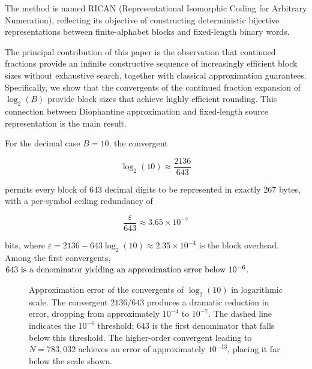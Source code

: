 \documentclass[10pt, onecolumn]{IEEEtran}
\begin{document}
The method is named RICAN (Representational Isomorphic Coding for Arbitrary Numeration), reflecting its objective of constructing deterministic bijective representations between finite-alphabet blocks and fixed-length binary words.

The principal contribution of this paper is the observation that continued fractions provide an infinite constructive sequence of increasingly efficient block sizes without exhaustive search, together with classical approximation guarantees. Specifically, we show that the convergents of the continued fraction expansion of \(\log_2(B)\) provide block sizes that achieve highly efficient rounding. This connection between Diophantine approximation and fixed-length source representation is the main result.

For the decimal case \(B=10\), the convergent

\[
\log_2(10)\approx\frac{2136}{643}
\]

permits every block of \(643\) decimal digits to be represented in exactly \(267\) bytes, with a per-symbol ceiling redundancy of

\[
\frac{\varepsilon}{643} \approx 3.65\times10^{-7}
\]

bits, where \(\varepsilon = 2136 - 643\log_2(10) \approx 2.35\times10^{-4}\) is the block overhead. Among the first convergents, \(643$ is a denominator yielding an approximation error below $10^{-6}\).

\begin{figure}[ht]
\centering
{}
\caption{Approximation error of the convergents of $\log_2(10)$ in logarithmic scale. The convergent $2136/643$ produces a dramatic reduction in error, dropping from approximately $10^{-4}$ to $10^{-7}$. The dashed line indicates the $10^{-6}$ threshold; $643$ is the first denominator that falls below this threshold. The higher-order convergent leading to $N=783,032$ achieves an error of approximately $10^{-13}$, placing it far below the scale shown.}
\label{fig:error}
\end{figure}
\end{document}
